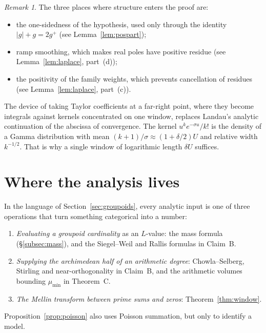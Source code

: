 \documentclass[11pt]{amsart}
\theoremstyle{definition}
\theoremstyle{remark}
\newtheorem{remark}[theorem]{Remark}
\begin{document}
\begin{remark}
The three places where structure enters the proof are:
\begin{itemize}
\item the one-sidedness of the hypothesis, used only through the identity $|g|+g=2g^+$ (see Lemma~\ref{lem:pospart});
\item ramp smoothing, which makes real poles have positive residue (see Lemma~\ref{lem:laplace}, part~(d));
\item the positivity of the family weights, which prevents cancellation of residues (see Lemma~\ref{lem:laplace}, part~(c)).
\end{itemize}
The device of taking Taylor coefficients at a far-right point, where they become integrals against kernels concentrated on one window, replaces Landau's analytic continuation of the abscissa of convergence. The kernel $u^ke^{-\sigma u}/k!$ is the density of a Gamma distribution with mean $(k+1)/\sigma\approx(1+\delta/2)U$ and relative width $k^{-1/2}$. That is why a single window of logarithmic length $\delta U$ suffices.
\end{remark}

\section{Where the analysis lives}\label{sec:analysis}

In the language of Section~\ref{sec:groupoids}, every analytic input is one of three operations that turn something categorical into a number:
\begin{enumerate}[label=(\arabic*)]
\item \emph{Evaluating a groupoid cardinality} as an $L$-value: the mass formula (\S\ref{subsec:mass}), and the Siegel--Weil and Rallis formulas in Claim~B.
\item \emph{Supplying the archimedean half of an arithmetic degree}: Chowla--Selberg, Stirling and near-orthogonality in Claim~B, and the arithmetic volumes bounding $\mu_{\min}$ in Theorem~C.
\item \emph{The Mellin transform between prime sums and zeros}: Theorem~\ref{thm:window}.
\end{enumerate}
Proposition~\ref{prop:poisson} also uses Poisson summation, but only to identify a model.
\end{document}
